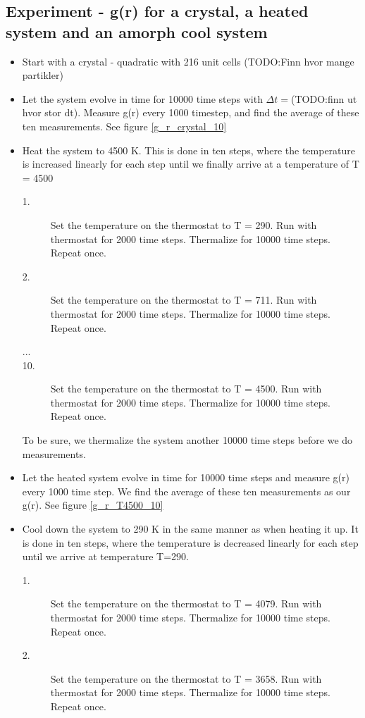 \subsection{Experiment  - g(r) for a crystal, a heated system and an amorph cool system}
\begin{itemize}
 \item Start with a crystal - quadratic with 216 unit cells (TODO:Finn hvor mange partikler)
 \item Let the system evolve in time for 10000 time steps with $\Delta t = $(TODO:finn ut hvor stor dt). Measure g(r) every 1000 timestep, and find the average of these ten measurements. See figure \ref{g_r_crystal_10}
 \item Heat the system to 4500 K. This is done in ten steps, where the temperature is increased linearly for each step until we finally arrive at a temperature of T = 4500
      \begin{description}
      \item[1.] Set the temperature on the thermostat to T = 290. Run with thermostat for 2000 time steps. Thermalize for 10000 time steps. Repeat once.
      \item[2.] Set the temperature on the thermostat to T = 711. Run with thermostat for 2000 time steps. Thermalize for 10000 time steps. Repeat once.
      \item[...] 
      \item[10.] Set the temperature on the thermostat to T = 4500. Run with thermostat for 2000 time steps. Thermalize for 10000 time steps. Repeat once.
      \end{description}
      To be sure, we thermalize the system another 10000 time steps before we do measurements.
\item Let the heated system evolve in time for 10000 time steps and measure g(r) every 1000 time step. We find the average of these ten measurements as our g(r). See figure \ref{g_r_T4500_10}
\item Cool down the system to 290 K in the same manner as when heating it up. It is done in ten steps, where the temperature is decreased linearly for each step until we arrive at temperature T=290.
      \begin{description}
      \item[1.] Set the temperature on the thermostat to T = 4079. Run with thermostat for 2000 time steps. Thermalize for 10000 time steps. Repeat once.
      \item[2.] Set the temperature on the thermostat to T = 3658. Run with thermostat for 2000 time steps. Thermalize for 10000 time steps. Repeat once.

\end{description}
\end{itemize}
